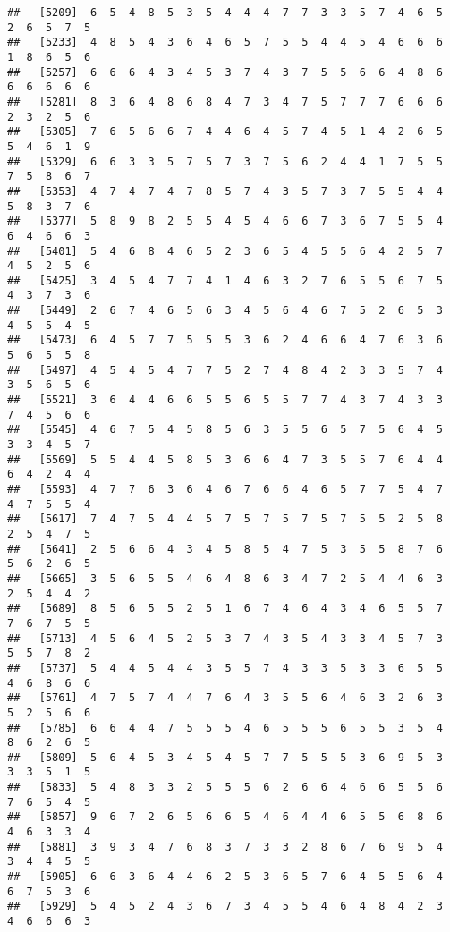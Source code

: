 \documentclass[
]{book}
\begin{document}
\begin{verbatim}
##   [5209]  6  5  4  8  5  3  5  4  4  4  7  7  3  3  5  7  4  6  5  2  6  5  7  5
##   [5233]  4  8  5  4  3  6  4  6  5  7  5  5  4  4  5  4  6  6  6  1  8  6  5  6
##   [5257]  6  6  6  4  3  4  5  3  7  4  3  7  5  5  6  6  4  8  6  6  6  6  6  6
##   [5281]  8  3  6  4  8  6  8  4  7  3  4  7  5  7  7  7  6  6  6  2  3  2  5  6
##   [5305]  7  6  5  6  6  7  4  4  6  4  5  7  4  5  1  4  2  6  5  5  4  6  1  9
##   [5329]  6  6  3  3  5  7  5  7  3  7  5  6  2  4  4  1  7  5  5  7  5  8  6  7
##   [5353]  4  7  4  7  4  7  8  5  7  4  3  5  7  3  7  5  5  4  4  5  8  3  7  6
##   [5377]  5  8  9  8  2  5  5  4  5  4  6  6  7  3  6  7  5  5  4  6  4  6  6  3
##   [5401]  5  4  6  8  4  6  5  2  3  6  5  4  5  5  6  4  2  5  7  4  5  2  5  6
##   [5425]  3  4  5  4  7  7  4  1  4  6  3  2  7  6  5  5  6  7  5  4  3  7  3  6
##   [5449]  2  6  7  4  6  5  6  3  4  5  6  4  6  7  5  2  6  5  3  4  5  5  4  5
##   [5473]  6  4  5  7  7  5  5  5  3  6  2  4  6  6  4  7  6  3  6  5  6  5  5  8
##   [5497]  4  5  4  5  4  7  7  5  2  7  4  8  4  2  3  3  5  7  4  3  5  6  5  6
##   [5521]  3  6  4  4  6  6  5  5  6  5  5  7  7  4  3  7  4  3  3  7  4  5  6  6
##   [5545]  4  6  7  5  4  5  8  5  6  3  5  5  6  5  7  5  6  4  5  3  3  4  5  7
##   [5569]  5  5  4  4  5  8  5  3  6  6  4  7  3  5  5  7  6  4  4  6  4  2  4  4
##   [5593]  4  7  7  6  3  6  4  6  7  6  6  4  6  5  7  7  5  4  7  4  7  5  5  4
##   [5617]  7  4  7  5  4  4  5  7  5  7  5  7  5  7  5  5  2  5  8  2  5  4  7  5
##   [5641]  2  5  6  6  4  3  4  5  8  5  4  7  5  3  5  5  8  7  6  5  6  2  6  5
##   [5665]  3  5  6  5  5  4  6  4  8  6  3  4  7  2  5  4  4  6  3  2  5  4  4  2
##   [5689]  8  5  6  5  5  2  5  1  6  7  4  6  4  3  4  6  5  5  7  7  6  7  5  5
##   [5713]  4  5  6  4  5  2  5  3  7  4  3  5  4  3  3  4  5  7  3  5  5  7  8  2
##   [5737]  5  4  4  5  4  4  3  5  5  7  4  3  3  5  3  3  6  5  5  4  6  8  6  6
##   [5761]  4  7  5  7  4  4  7  6  4  3  5  5  6  4  6  3  2  6  3  5  2  5  6  6
##   [5785]  6  6  4  4  7  5  5  5  4  6  5  5  5  6  5  5  3  5  4  8  6  2  6  5
##   [5809]  5  6  4  5  3  4  5  4  5  7  7  5  5  5  3  6  9  5  3  3  3  5  1  5
##   [5833]  5  4  8  3  3  2  5  5  5  6  2  6  6  4  6  6  5  5  6  7  6  5  4  5
##   [5857]  9  6  7  2  6  5  6  6  5  4  6  4  4  6  5  5  6  8  6  4  6  3  3  4
##   [5881]  3  9  3  4  7  6  8  3  7  3  3  2  8  6  7  6  9  5  4  3  4  4  5  5
##   [5905]  6  6  3  6  4  4  6  2  5  3  6  5  7  6  4  5  5  6  4  6  7  5  3  6
##   [5929]  5  4  5  2  4  3  6  7  3  4  5  5  4  6  4  8  4  2  3  4  6  6  6  3

\end{verbatim}
\end{document}
